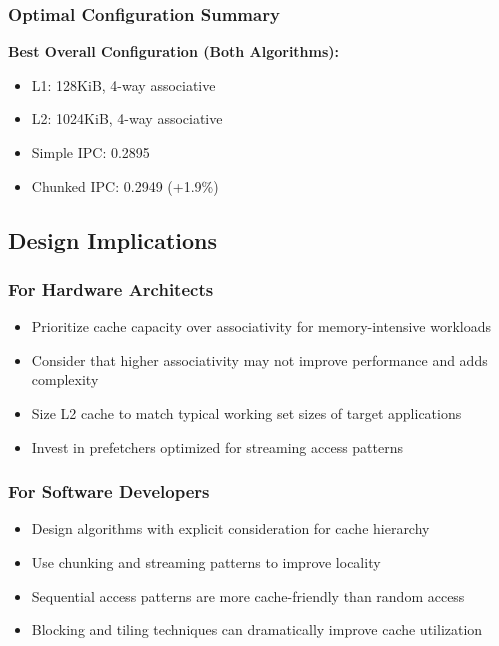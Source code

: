 \documentclass[12pt,a4paper]{article}
\begin{document}
\subsubsection{Optimal Configuration Summary}

\textbf{Best Overall Configuration (Both Algorithms):}
\begin{itemize}
    \item L1: 128KiB, 4-way associative
    \item L2: 1024KiB, 4-way associative
    \item Simple IPC: 0.2895
    \item Chunked IPC: 0.2949 (+1.9\%)
\end{itemize}

\subsection{Design Implications}

\subsubsection{For Hardware Architects}
\begin{itemize}
    \item Prioritize cache capacity over associativity for memory-intensive workloads
    \item Consider that higher associativity may not improve performance and adds complexity
    \item Size L2 cache to match typical working set sizes of target applications
    \item Invest in prefetchers optimized for streaming access patterns
\end{itemize}

\subsubsection{For Software Developers}
\begin{itemize}
    \item Design algorithms with explicit consideration for cache hierarchy
    \item Use chunking and streaming patterns to improve locality
    \item Sequential access patterns are more cache-friendly than random access
    \item Blocking and tiling techniques can dramatically improve cache utilization
\end{itemize}
\end{document}
